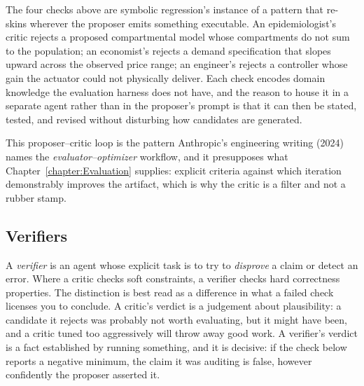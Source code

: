 \begin{example}
The four checks above are symbolic regression's instance of a pattern that re-skins wherever the proposer emits something executable.
An epidemiologist's critic rejects a proposed compartmental model whose compartments do not sum to the population; an economist's rejects a demand specification that slopes upward across the observed price range; an engineer's rejects a controller whose gain the actuator could not physically deliver.
Each check encodes domain knowledge the evaluation harness does not have, and the reason to house it in a separate agent rather than in the proposer's prompt is that it can then be stated, tested, and revised without disturbing how candidates are generated.
\end{example}

This proposer--critic loop is the pattern Anthropic's engineering writing (2024) names the \emph{evaluator--optimizer} workflow, and it presupposes what Chapter~\ref{chapter:Evaluation} supplies: explicit criteria against which iteration demonstrably improves the artifact, which is why the critic is a filter and not a rubber stamp.

\subsection{Verifiers}

A \emph{verifier} is an agent whose explicit task is to try to \emph{disprove} a claim or detect an error.
Where a critic checks soft constraints, a verifier checks hard correctness properties.
The distinction is best read as a difference in what a failed check licenses you to conclude.
A critic's verdict is a judgement about plausibility: a candidate it rejects was probably not worth evaluating, but it might have been, and a critic tuned too aggressively will throw away good work.
A verifier's verdict is a fact established by running something, and it is decisive: if the check below reports a negative minimum, the claim it was auditing is false, however confidently the proposer asserted it.


